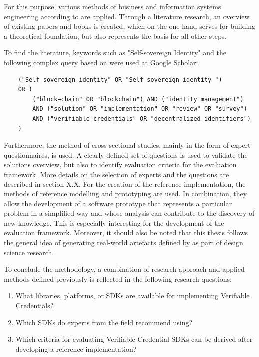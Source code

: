     For this purpose, various methods of business and information systems engineering according to \cite{wilde_forschungsmethoden_2007} are applied. Through a literature research, an overview of existing papers and books is created, which on the one hand serves for building a theoretical foundation, but also represents the basis for all other steps. 
    
    To find the literature, keywords such as "Self-sovereign Identity" and the following complex query based on \cite{van_bokkem_self-sovereign_2019} were used at Google Scholar:
    \begin{verbatim}
    ("Self-sovereign identity" OR "Self sovereign identity ") 
    OR ( 
        ("block−chain" OR "blockchain") AND ("identity management")
        AND ("solution" OR "implementation" OR "review" OR "survey")            
        AND ("verifiable credentials" OR "decentralized identifiers")
    )
    \end{verbatim}
    Furthermore, the method of cross-sectional studies, mainly in the form of expert questionnaires, is used. A clearly defined set of questions is used to validate the solutions overview, but also to identify evaluation criteria for the evaluation framework. More details on the selection of experts and the questions are described in section X.X. For the creation of the reference implementation, the methods of reference modelling and prototyping are used. In combination, they allow the development of a software prototype that represents a particular problem in a simplified way and whose analysis can contribute to the discovery of new knowledge. This is especially interesting for the development of the evaluation framework. Moreover, it should also be noted that this thesis follows the general idea of generating real-world artefacts defined by \cite{hevner_three_2007} as part of design science research. 
    
    To conclude the methodology, a combination of research approach and applied methods defined previously is reflected in the following research questions: 
    
    \begin{enumerate}
      \item What libraries, platforms, or SDKs are available for implementing Verifiable Credentials?
      \item Which SDKs do experts from the field recommend using?
      \item Which criteria for evaluating Verifiable Credential SDKs can be derived after developing a reference implementation?
    \end{enumerate}
    
    
    
    
    
    

